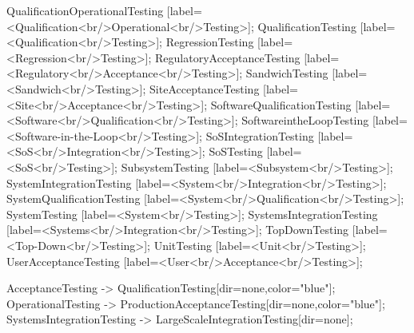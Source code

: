 \documentclass{article}
\begin{document}
{QualificationOperationalTesting [label=<Qualification<br/>Operational<br/>Testing>];
QualificationTesting [label=<Qualification<br/>Testing>];
RegressionTesting [label=<Regression<br/>Testing>];
RegulatoryAcceptanceTesting [label=<Regulatory<br/>Acceptance<br/>Testing>];
SandwichTesting [label=<Sandwich<br/>Testing>];
SiteAcceptanceTesting [label=<Site<br/>Acceptance<br/>Testing>];
SoftwareQualificationTesting [label=<Software<br/>Qualification<br/>Testing>];
SoftwareintheLoopTesting [label=<Software-in-the-Loop<br/>Testing>];
SoSIntegrationTesting [label=<SoS<br/>Integration<br/>Testing>];
SoSTesting [label=<SoS<br/>Testing>];
SubsystemTesting [label=<Subsystem<br/>Testing>];
SystemIntegrationTesting [label=<System<br/>Integration<br/>Testing>];
SystemQualificationTesting [label=<System<br/>Qualification<br/>Testing>];
SystemTesting [label=<System<br/>Testing>];
SystemsIntegrationTesting [label=<Systems<br/>Integration<br/>Testing>];
TopDownTesting [label=<Top-Down<br/>Testing>];
UnitTesting [label=<Unit<br/>Testing>];
UserAcceptanceTesting [label=<User<br/>Acceptance<br/>Testing>];

AcceptanceTesting -> QualificationTesting[dir=none,color="blue"];
OperationalTesting -> ProductionAcceptanceTesting[dir=none,color="blue"];
SystemsIntegrationTesting -> LargeScaleIntegrationTesting[dir=none];

}
\end{document}
